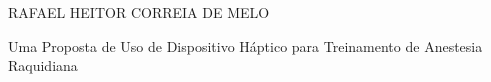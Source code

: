 \cleardoublepage


\pagestyle{ruledheader}
\setcounter{page}{1}

\cleardoublepage
\thispagestyle{empty}

\vspace{-60mm}

\begin{center}
   {\large RAFAEL HEITOR CORREIA DE MELO}\\
   \vspace{7mm}

   Uma Proposta de Uso de Dispositivo Háptico
para Treinamento de Anestesia Raquidiana\\
  \vspace{10mm}
\end{center}

